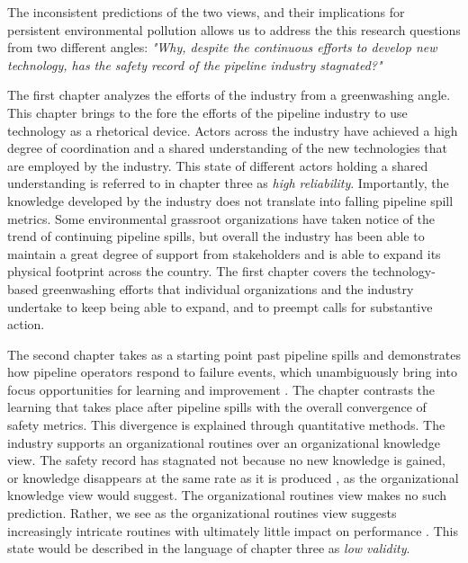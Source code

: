 The inconsistent predictions of the two views, and their implications for persistent environmental pollution allows us to address the this research questions from two different angles: \textit{"Why, despite the continuous efforts to develop new technology, has the safety record of the pipeline industry stagnated?"}

The first chapter analyzes the efforts of the industry from a greenwashing angle. This chapter brings to the fore the efforts of the pipeline industry to use technology as a rhetorical device. Actors across the industry have achieved a high degree of coordination and a shared understanding of the new technologies that are employed by the industry. This state of different actors holding a shared understanding is referred to in chapter three as \textit{high reliability}. Importantly, the knowledge developed by the industry does not translate into falling pipeline spill metrics. Some environmental grassroot organizations have taken notice of the trend of continuing pipeline spills, but overall the industry has been able to maintain a great degree of support from stakeholders and is able to expand its physical footprint across the country. The first chapter covers the technology-based greenwashing efforts that individual organizations and the industry undertake to keep being able to expand, and to preempt calls for substantive action.

The second chapter takes as a starting point past pipeline spills and demonstrates how pipeline operators respond to failure events, which unambiguously bring into focus opportunities for learning and improvement \citep{Madsen2010}. The chapter contrasts the learning that takes place after pipeline spills with the overall convergence of safety metrics. This divergence is explained through quantitative methods. The industry supports an organizational routines over an organizational knowledge view. The safety record has stagnated not because no new knowledge is gained, or knowledge disappears at the same rate as it is produced \citep{Argote2013-3}, as the organizational knowledge view would suggest. The organizational routines view makes no such prediction. Rather, we see as the organizational routines view suggests increasingly intricate routines with ultimately little impact on performance \citep{March1991}. This state would be described in the language of chapter three as \textit{low validity}.

